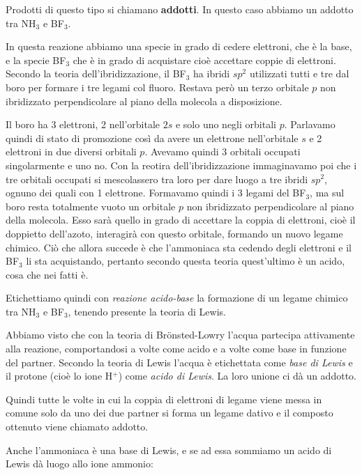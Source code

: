 Prodotti di questo tipo si chiamano \textbf{addotti}. In questo caso abbiamo un addotto tra NH$_3$ e BF$_3$.

In questa reazione abbiamo una specie in grado di cedere elettroni, che è la base, e la specie BF$_3$ che è in grado di acquistare cioè accettare coppie di elettroni. Secondo la teoria dell'ibridizzazione, il BF$_3$ ha ibridi $sp^2$ utilizzati tutti e tre dal boro per formare i tre legami col fluoro. Restava però un terzo orbitale $p$ non ibridizzato perpendicolare al piano della molecola a disposizione.

Il boro ha 3 elettroni, 2 nell'orbitale $2s$ e solo uno negli orbitali $p$. Parlavamo quindi di stato di promozione così da avere un elettrone nell'orbitale $s$ e 2 elettroni in due diversi orbitali $p$. Avevamo quindi 3 orbitali occupati singolarmente e uno no. Con la reotira dell'ibridizzazione immaginavamo poi che i tre orbitali occupati si mescolassero tra loro per dare luogo a tre ibridi $sp^2$, ognuno dei quali con 1 elettrone. Formavamo quindi i 3 legami del BF$_3$, ma sul boro resta totalmente vuoto un orbitale $p$ non ibridizzato perpendicolare al piano della molecola. Esso sarà quello in grado di accettare la coppia di elettroni, cioè il doppietto dell'azoto, interagirà con questo orbitale, formando un nuovo legame chimico. Ciò che allora succede è che l'ammoniaca sta cedendo degli elettroni e il BF$_3$ li sta acquistando, pertanto secondo questa teoria quest'ultimo è un acido, cosa che nei fatti è.

\vspace{0.2cm}Etichettiamo quindi con \textit{reazione acido-base} la formazione di un legame chimico tra NH$_3$ e BF$_3$, tenendo presente la teoria di Lewis.

\vspace{0.2cm}Abbiamo visto che con la teoria di  Br\"{o}nsted-Lowry l'acqua partecipa attivamente alla reazione, comportandosi a volte come acido e a volte come base in funzione del partner. Secondo la teoria di Lewis l'acqua è etichettata come \textit{base di Lewis} e il protone (cioè lo ione H$^+$) come \textit{acido di Lewis}. La loro unione ci dà un addotto.

Quindi tutte le volte in cui la coppia di elettroni di legame viene messa in comune solo da uno dei due partner si forma un legame dativo e il composto ottenuto viene chiamato addotto.

Anche l'ammoniaca è una base di Lewis, e se ad essa sommiamo un acido di Lewis dà luogo allo ione ammonio:

